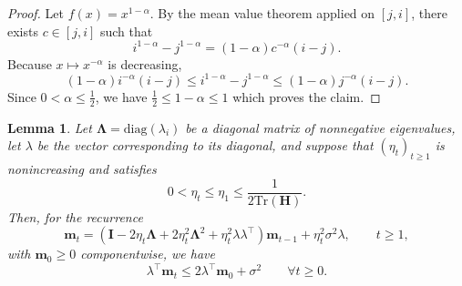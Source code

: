 \documentclass{article}
\newtheorem{lemma}{Lemma}
\def\m{{\mathbf{m}}}
\def\H{{\mathbf{H}}}
\def\H{{\mathbf{H}}}
\def\I{{\mathbf{I}}}
\def\diag{\text{diag}}
\def\LLambda{{\mathbf{\Lambda}}}
\def\tr{\text{Tr}}
\def\m{{\mathbf{m}}}
\def\H{{\mathbf{H}}}
\def\H{{\mathbf{H}}}
\def\LLambda{{\mathbf{\Lambda}}}
\def\tr{\text{Tr}}
\def\I{\mathbf{I}}
\theoremstyle{plain}
\def\m{{\mathbf{m}}}
\def\H{{\mathbf{H}}}
\def\I{{\mathbf{I}}}
\def\diag{{\text{diag}}}
\def\LLambda{{\mathbf{\Lambda}}}
\begin{document}
\begin{proof}
Let $f(x)=x^{1-\alpha}$. By the mean value theorem applied on
$[j,i]$, there exists $c\in[j,i]$ such that
\[
i^{1-\alpha}-j^{1-\alpha}
=
(1-\alpha)c^{-\alpha}(i-j).
\]
Because $x\mapsto x^{-\alpha}$ is decreasing,
\[
(1-\alpha)i^{-\alpha}(i-j)
\le
i^{1-\alpha}-j^{1-\alpha}
\le
(1-\alpha)j^{-\alpha}(i-j).
\]
Since $0<\alpha\le \frac12$, we have $\frac{1}{2} \leq 1-\alpha \leq 1$ which proves the claim.
\end{proof}
\begin{lemma}
    \label{lem:bounded_risk}
    Let $\LLambda = \diag(\lambda_i)$ be a diagonal matrix of
    nonnegative eigenvalues, let $\lambda$ be the vector corresponding
    to its diagonal, and suppose that $(\eta_t)_{t\geq 1}$ is
    nonincreasing and satisfies
    \[
    0 < \eta_t \leq \eta_1 \leq \frac{1}{2 \tr(\H)}.
    \]
    Then, for the recurrence
    \[
    \m_t
    =
    \left(
        \I
        - 2 \eta_t \LLambda
        + 2 \eta_t^2 \LLambda^2
        + \eta_t^2 \lambda \lambda^\top
    \right)\m_{t-1}
    + \eta_t^2 \sigma^2 \lambda,
    \qquad t\geq 1,
    \]
    with $\m_0\geq 0$ componentwise, we have
    \[
    \lambda^\top \m_t
    \leq
    2 \lambda^\top \m_0 + \sigma^2
    \qquad \forall t \geq 0.
    \]
\end{lemma}
\end{document}
